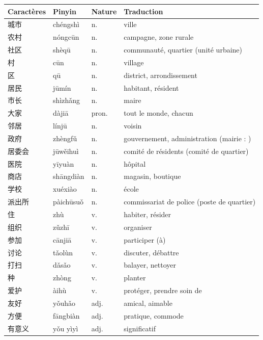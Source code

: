 \documentclass[11pt]{article}
\newcommand{\zh}[1]{\ifmmode\text{#1}\else{#1}\fi}
\begin{document}
\begin{center}
\begin{tabularx}{\linewidth}{|X|X|X|X|}
\hline
\rowcolor{popblueL} \textbf{Caractères} & \textbf{Pinyin} & \textbf{Nature} & \textbf{Traduction} \\
\hline
城市 & chéngshì & n. & ville \\
农村 & nóngcūn & n. & campagne, zone rurale \\
社区 & shèqū & n. & communauté, quartier (unité urbaine) \\
村 & cūn & n. & village \\
区 & qū & n. & district, arrondissement \\
\hline
居民 & jūmín & n. & habitant, résident \\
市长 & shìzhǎng & n. & maire \\
大家 & dàjiā & pron. & tout le monde, chacun \\
邻居 & línjū & n. & voisin \\
\hline
政府 & zhèngfǔ & n. & gouvernement, administration (mairie : \zh{市政府}) \\
居委会 & jūwěihuì & n. & comité de résidents (comité de quartier) \\
医院 & yīyuàn & n. & hôpital \\
商店 & shāngdiàn & n. & magasin, boutique \\
学校 & xuéxiào & n. & école \\
派出所 & pàichūsuǒ & n. & commissariat de police (poste de quartier) \\
\hline
住 & zhù & v. & habiter, résider \\
组织 & zǔzhī & v. & organiser \\
参加 & cānjiā & v. & participer (à) \\
讨论 & tǎolùn & v. & discuter, débattre \\
打扫 & dǎsǎo & v. & balayer, nettoyer \\
种 & zhòng & v. & planter \\
爱护 & àihù & v. & protéger, prendre soin de \\
\hline
友好 & yǒuhǎo & adj. & amical, aimable \\
方便 & fāngbiàn & adj. & pratique, commode \\
有意义 & yǒu yìyì & adj. & significatif \\
\hline
\end{tabularx}
\end{center}
\end{document}

